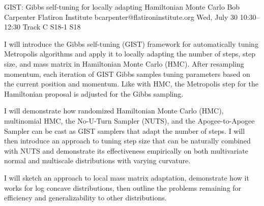 \begin{talk}
  {GIST: Gibbs self-tuning for locally adapting Hamiltonian Monte Carlo}%
  {Bob Carpenter}%
  {Flatiron Institute}%
  {bcarpenter@flatironinstitute.org}%
  {}%
  {}%
  {Wed, July 30 10:30–12:30 Track C}%
  {S18-1}%
  {S18}%
  {}%
  
				
			
I will introduce the Gibbs self-tuning (GIST) framework for automatically tuning Metropolis algorithms and apply it to locally adapting the number of steps, step size, and mass matrix in Hamiltonian Monte Carlo (HMC).  After resampling momentum, each iteration of GIST Gibbs samples tuning parameters based on the current position and momentum.  Like with HMC, the Metropolis step for the Hamiltonian proposal is adjusted for the Gibbs sampling.

I will demonstrate how randomized Hamiltonian Monte Carlo (HMC), multinomial HMC, the No-U-Turn Sampler (NUTS), and the Apogee-to-Apogee Sampler can be cast as GIST samplers that adapt the number of steps.  I will then introduce an approach to tuning step size that can be naturally combined with NUTS and demonstrate its effectiveness empirically on both multivariate normal and multiscale distributions with varying curvature.  

I will sketch an approach to local mass matrix adaptation, demonstrate how it works for log concave distributions, then outline the problems remaining for efficiency and generalizability to other distributions.

\end{talk}

